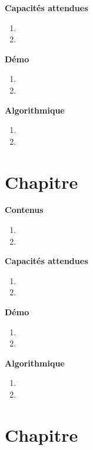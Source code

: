 \documentclass[10pt,a4paper]{article}
\begin{document}
\textbf{Capacités attendues}

\begin{enumerate}
\item 
\item 
\end{enumerate}

\textbf{Démo}

\begin{enumerate}
\item 
\item 
\end{enumerate}

\textbf{Algorithmique}

\begin{enumerate}
\item 
\item 
\end{enumerate}

\section{Chapitre}

\textbf{Contenus}

\begin{enumerate} 
\item 
\item 
\end{enumerate}


\textbf{Capacités attendues}

\begin{enumerate}
\item 
\item 
\end{enumerate}

\textbf{Démo}

\begin{enumerate}
\item 
\item 
\end{enumerate}

\textbf{Algorithmique}

\begin{enumerate}
\item 
\item 
\end{enumerate}

\section{Chapitre}
\end{document}
